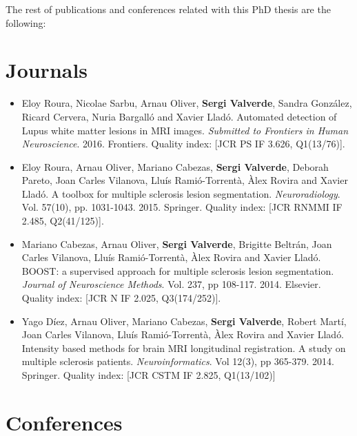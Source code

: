 The rest of publications and conferences related with this PhD thesis are the following:

\section*{Journals}

\begin{itemize}

\item Eloy Roura, Nicolae Sarbu, Arnau Oliver, \textbf{Sergi Valverde}, Sandra Gonz\'{a}lez, Ricard Cervera, Nuria Bargall\'{o} and Xavier Llad\'{o}. Automated detection of Lupus white matter lesions in MRI images. \textit{Submitted to Frontiers in Human Neuroscience}. 2016. Frontiers.  Quality index: [JCR PS IF 3.626, Q1(13/76)].

\item Eloy Roura, Arnau Oliver, Mariano Cabezas, \textbf{Sergi Valverde}, Deborah Pareto, Joan Carles Vilanova, Llu\'{i}s Rami\'{o}-Torrent\`{a}, \`{A}lex Rovira and Xavier Llad\'{o}. A toolbox for multiple sclerosis lesion segmentation. \textit{Neuroradiology}. Vol. 57(10),  pp. 1031-1043. 2015. Springer.  Quality index: [JCR RNMMI IF 2.485, Q2(41/125)].

\item Mariano Cabezas, Arnau Oliver, \textbf{Sergi Valverde}, Brigitte Beltr\'{a}n, Joan Carles Vilanova, Llu\'{i}s Rami\'{o}-Torrent\`{a}, \`{A}lex Rovira and Xavier Llad\'{o}. BOOST: a supervised approach for multiple sclerosis lesion segmentation. \textit{Journal of Neuroscience Methods}. Vol. 237, pp 108-117. 2014. Elsevier.  Quality index: [JCR N IF 2.025, Q3(174/252)].

\item Yago D\'{i}ez, Arnau Oliver, Mariano Cabezas, \textbf{Sergi Valverde}, Robert Mart\'{i}, Joan Carles Vilanova, Llu\'{i}s Rami\'{o}-Torrent\`{a}, \`{A}lex Rovira and Xavier Llad\'{o}. Intensity based methods for brain MRI longitudinal registration. A study on multiple sclerosis patients. \textit{Neuroinformatics}. Vol 12(3), pp 365-379. 2014. Springer.  Quality index: [JCR CSTM IF 2.825, Q1(13/102)] 

\end{itemize}


\section*{Conferences}

